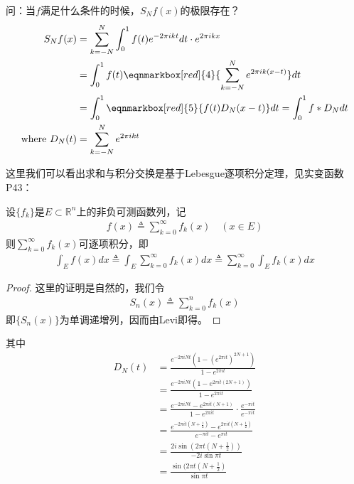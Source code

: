问：当$f$满足什么条件的时候，$S_N f(x)$的极限存在？
\begin{align*}
    S_N f(x) &= \sum\limits_{k=-N}^N \int_0^1 f(t) e^{-2\pi ikt} dt \cdot e^{2\pi ikx} \\
    & = \int_0^1 f(t) \eqnmarkbox[red]{4}{\sum\limits_{k=-N}^N e^{2\pi ik(x-t)}} dt \\
    & = \int_0^1 \eqnmarkbox[red]{5}{f(t) D_N(x-t)} dt = \int_0^1 f*D_N dt \\
    \text{where}\ D_N(t) &= \sum\limits_{k=-N}^N e^{2\pi ikt}
\end{align*}

这里我们可以看出求和与积分交换是基于Lebesgue逐项积分定理，见实变函数P43：
\begin{theorem}
    \color{blue}
    设$\{f_k\}$是$E\subset \mathbb{R}^n$上的非负可测函数列，记
    \begin{align*}
        f(x)\triangleq \sum\limits_{k=0}^{\infty} f_k(x) \quad (x\in E)
    \end{align*}
    则$\sum\limits_{k=0}^{\infty} f_k(x)$可逐项积分，即
    \begin{align*}
        \int_E f(x) dx \triangleq \int_E \sum\limits_{k=0}^{\infty} f_k(x) dx \triangleq \sum\limits_{k=0}^{\infty} \int_E f_k(x) dx
    \end{align*}
\end{theorem}
\begin{proof}
    \color{blue} 这里的证明是自然的，我们令
    \begin{align*}
        S_n(x) \triangleq \sum\limits_{k=0}^{n} f_k(x)
    \end{align*}
    即$\{S_n(x)\}$为单调递增列，因而由Levi即得。
\end{proof}

其中
\begin{align*}
    D_N(t) &= \frac{e^{-2\pi iNt}\left(1 - \left(e^{2\pi it}\right)^{2N+1} \right)}{1-e^{2\pi it}} \\
    &= \frac{e^{-2\pi iNt}(1-e^{2\pi i t (2N+1)})}{1 - e^{2\pi it}} \\
    & = \frac{e^{-2\pi iNt} - e^{2\pi i t(N+1)}}{1 - e^{2\pi i t}} \cdot \frac{e^{-\pi i t}}{e^{-\pi i t}} \\
    & = \frac{e^{-2\pi i t\left(N+\frac{1}{2}\right)} - e^{2\pi i t \left(N + \frac{1}{2}\right)}}{e^{-\pi i t} - e^{\pi i t}} \\
    & = \frac{2i \sin\left(2\pi t \left(N+ \frac{1}{2}\right)\right)}{ -2i \sin \pi t} \\
    & = \frac{\sin (2\pi t(N+\frac{1}{2})}{\sin \pi t}
\end{align*}

